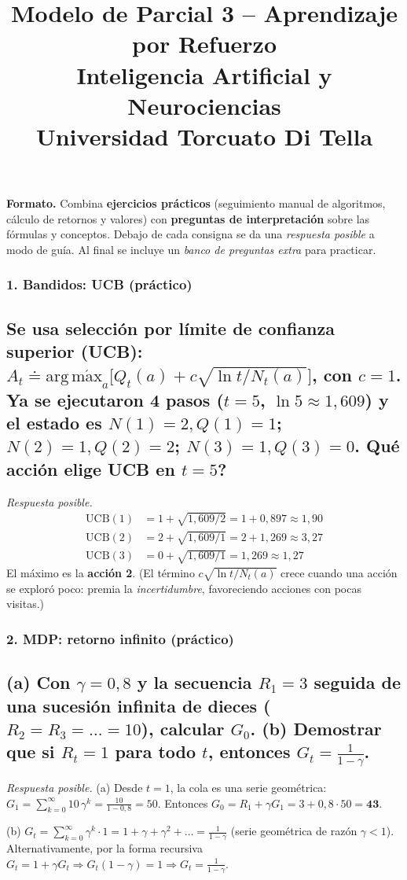 \documentclass[11pt, a4paper]{article}
\title{\textbf{Modelo de Parcial 3 -- Aprendizaje por Refuerzo} \\
\large Inteligencia Artificial y Neurociencias \\ Universidad Torcuato Di Tella}
\author{}
\date{}
\newcommand{\pregunta}[1]{\subsection{#1}}
\newcommand{\eje}[1]{\subsubsection{#1}}
\newcommand{\argmax}{\operatorname*{arg\,m\acute{a}x}}
\begin{document}
\maketitle

\begin{mdframed}[linecolor=black, linewidth=0.7pt]
\textbf{Formato.} Combina \textbf{ejercicios pr\'acticos} (seguimiento manual de algoritmos, c\'alculo de retornos y valores) con \textbf{preguntas de interpretaci\'on} sobre las f\'ormulas y conceptos. Debajo de cada consigna se da una \emph{respuesta posible} a modo de gu\'ia. Al final se incluye un \emph{banco de preguntas extra} para practicar.
\end{mdframed}

\eje{1. Bandidos: UCB (pr\'actico)}
\pregunta{Se usa selecci\'on por l\'imite de confianza superior (UCB): $A_t \doteq \argmax_a\big[Q_t(a) + c\sqrt{\ln t / N_t(a)}\big]$, con $c=1$. Ya se ejecutaron 4 pasos ($t=5$, $\ln 5 \approx 1{,}609$) y el estado es $N(1){=}2, Q(1){=}1$; $N(2){=}1, Q(2){=}2$; $N(3){=}1, Q(3){=}0$. \textquestiondown Qu\'e acci\'on elige UCB en $t=5$?}

\begin{respuesta}
\textit{Respuesta posible.}
\begin{align*}
\text{UCB}(1) &= 1 + \sqrt{1{,}609/2} = 1 + 0{,}897 \approx 1{,}90 \\
\text{UCB}(2) &= 2 + \sqrt{1{,}609/1} = 2 + 1{,}269 \approx 3{,}27 \\
\text{UCB}(3) &= 0 + \sqrt{1{,}609/1} = 1{,}269 \approx 1{,}27
\end{align*}
El m\'aximo es la \textbf{acci\'on 2}. (El t\'ermino $c\sqrt{\ln t/N_t(a)}$ crece cuando una acci\'on se explor\'o poco: premia la \emph{incertidumbre}, favoreciendo acciones con pocas visitas.)
\end{respuesta}

\eje{2. MDP: retorno infinito (pr\'actico)}
\pregunta{(a) Con $\gamma=0{,}8$ y la secuencia $R_1=3$ seguida de una sucesi\'on infinita de dieces ($R_2=R_3=\dots=10$), calcular $G_0$. (b) Demostrar que si $R_t=1$ para todo $t$, entonces $G_t = \frac{1}{1-\gamma}$.}

\begin{respuesta}
\textit{Respuesta posible.} (a) Desde $t=1$, la cola es una serie geom\'etrica: $G_1 = \sum_{k=0}^{\infty}10\,\gamma^{k} = \frac{10}{1-0{,}8}=50$. Entonces $G_0 = R_1 + \gamma G_1 = 3 + 0{,}8\cdot 50 = \mathbf{43}$.

(b) $G_t = \sum_{k=0}^{\infty}\gamma^{k}\cdot 1 = 1 + \gamma + \gamma^2 + \dots = \frac{1}{1-\gamma}$ (serie geom\'etrica de raz\'on $\gamma<1$). Alternativamente, por la forma recursiva $G_t = 1 + \gamma G_t \Rightarrow G_t(1-\gamma)=1 \Rightarrow G_t=\frac{1}{1-\gamma}$.
\end{respuesta}
\end{document}
